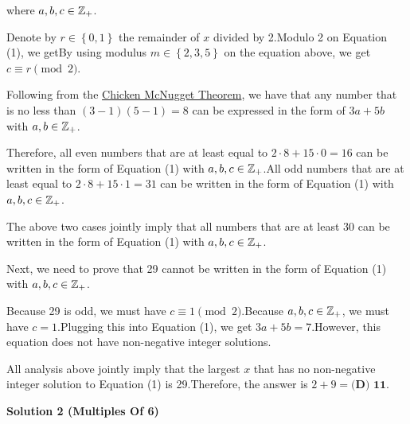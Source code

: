 \begin{enumerate}
 where $a, b, c \in \Bbb Z_+$.

 Denote by $r \in \left\{ 0, 1 \right\}$ the remainder of $x$ divided by 2.Modulo 2 on Equation (1), we getBy using modulus $m \in \left\{ 2, 3, 5 \right\}$ on the equation above, we get$c \equiv r \pmod{2}$. 

 Following from the \href{https://artofproblemsolving.com/wiki/index.php?title=Chicken\_McNugget\_Theorem}{Chicken McNugget Theorem}, we have that any number that is no less than $(3-1)(5-1) = 8$ can be expressed in the form of $3a + 5b$ with $a, b \in \Bbb Z_+$.

 Therefore, all even numbers that are at least equal to $2 \cdot 8 + 15 \cdot 0 = 16$ can be written in the form of Equation (1) with $a, b, c \in \Bbb Z_+$.All odd numbers that are at least equal to $2 \cdot 8 + 15 \cdot 1 = 31$ can be written in the form of Equation (1) with $a, b, c \in \Bbb Z_+$.

 The above two cases jointly imply that all numbers that are at least 30 can be written in the form of Equation (1) with $a, b, c \in \Bbb Z_+$.

 Next, we need to prove that 29 cannot be written in the form of Equation (1) with $a, b, c \in \Bbb Z_+$.

 Because 29 is odd, we must have $c \equiv 1 \pmod{2}$.Because $a, b, c \in \Bbb Z_+$, we must have $c = 1$.Plugging this into Equation (1), we get $3 a + 5 b = 7$.However, this equation does not have non-negative integer solutions.

 All analysis above jointly imply that the largest $x$ that has no non-negative integer solution to Equation (1) is 29.Therefore, the answer is $2 + 9 = \boxed{\textbf{(D) 11}}$.

 



\textbf{Solution 2 (Multiples Of 6)}


\end{enumerate}
